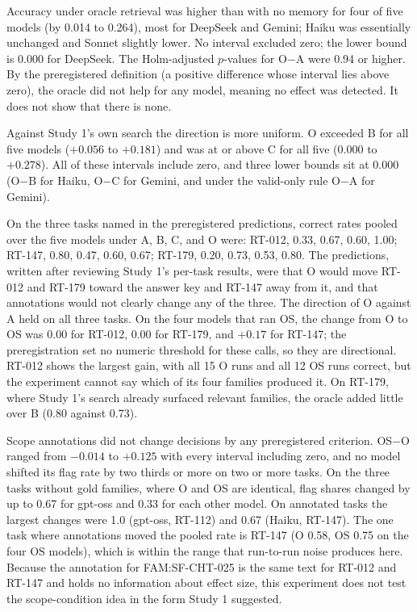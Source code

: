 \documentclass[11pt]{article}
\begin{document}
Accuracy under oracle retrieval was higher than with no memory for four of five models (by 0.014 to 0.264), most for DeepSeek and Gemini; Haiku was essentially unchanged and Sonnet slightly lower. No interval excluded zero; the lower bound is 0.000 for DeepSeek. The Holm-adjusted $p$-values for O$-$A were 0.94 or higher. By the preregistered definition (a positive difference whose interval lies above zero), the oracle did not help for any model, meaning no effect was detected. It does not show that there is none.

Against Study 1's own search the direction is more uniform. O exceeded B for all five models ($+0.056$ to $+0.181$) and was at or above C for all five ($0.000$ to $+0.278$). All of these intervals include zero, and three lower bounds sit at $0.000$ (O$-$B for Haiku, O$-$C for Gemini, and under the valid-only rule O$-$A for Gemini).

On the three tasks named in the preregistered predictions, correct rates pooled over the five models under A, B, C, and O were: RT-012, 0.33, 0.67, 0.60, 1.00; RT-147, 0.80, 0.47, 0.60, 0.67; RT-179, 0.20, 0.73, 0.53, 0.80. The predictions, written after reviewing Study 1's per-task results, were that O would move RT-012 and RT-179 toward the answer key and RT-147 away from it, and that annotations would not clearly change any of the three. The direction of O against A held on all three tasks. On the four models that ran OS, the change from O to OS was $0.00$ for RT-012, $0.00$ for RT-179, and $+0.17$ for RT-147; the preregistration set no numeric threshold for these calls, so they are directional. RT-012 shows the largest gain, with all 15 O runs and all 12 OS runs correct, but the experiment cannot say which of its four families produced it. On RT-179, where Study 1's search already surfaced relevant families, the oracle added little over B (0.80 against 0.73).

Scope annotations did not change decisions by any preregistered criterion. OS$-$O ranged from $-0.014$ to $+0.125$ with every interval including zero, and no model shifted its flag rate by two thirds or more on two or more tasks. On the three tasks without gold families, where O and OS are identical, flag shares changed by up to 0.67 for gpt-oss and 0.33 for each other model. On annotated tasks the largest changes were 1.0 (gpt-oss, RT-112) and 0.67 (Haiku, RT-147). The one task where annotations moved the pooled rate is RT-147 (O 0.58, OS 0.75 on the four OS models), which is within the range that run-to-run noise produces here. Because the annotation for FAM:SF-CHT-025 is the same text for RT-012 and RT-147 and holds no information about effect size, this experiment does not test the scope-condition idea in the form Study 1 suggested.
\end{document}
